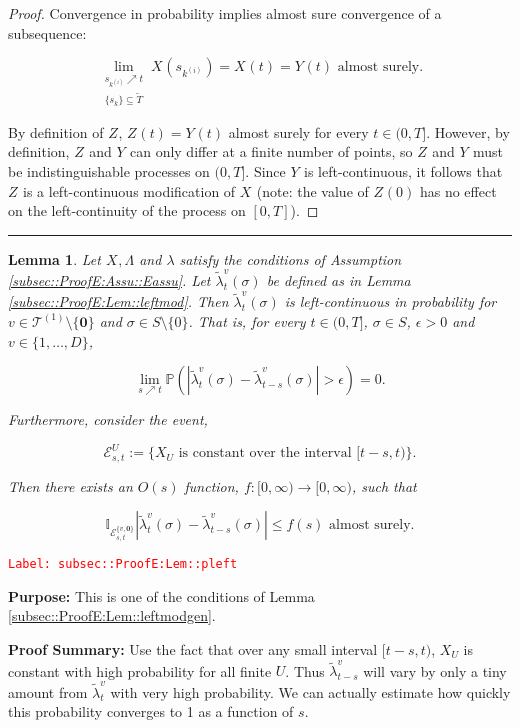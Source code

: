 \documentclass[12pt]{article}
\newcommand{\mb}{\mathbb}
\newcommand{\mc}{\mathcal}
\newcommand{\ra}{\rightarrow}
\newcommand{\te}{\text}
\newcommand{\ep}{\epsilon}
\newcommand{\tr}{\textcolor{red}}
\newcommand{\labe}[1]{\tr{\texttt{Label: #1}}}
\newcommand{\purpose}{\textbf{Purpose: }}
\newcommand{\pfsum}{\textbf{Proof Summary: }}
\newcommand{\lin}{\rule{\linewidth}{0.4 pt}}
\newcommand{\pr}{\mb{P}}							%
\renewcommand{\root}{\mathbf{0}}				%
\renewcommand{\v}{v}							%
\renewcommand{\U}{U}							%
\renewcommand{\S}{S}							%
\newcommand{\s}{\sigma}							%
\newcommand{\T}{T}								%
\renewcommand{\t}{t}							%
\renewcommand{\tt}{s}							%
\newcommand{\X}{X}								%
\newcommand{\vind}[1]{^{#1}}					%
\newcommand{\cind}[1]{_{#1}}					%
\newcommand{\tp}[1]{(#1)}						%
\newcommand{\tip}[1]{#1}						%
\newcommand{\ts}[1]{_{#1}}						%
\newcommand{\degr}{D}							%
\newcommand{\tree}{\mc{T}}						%
\newcommand{\sln}[1]{^{(#1)}}					%
\newcommand{\rate}{\lambda}						%
\newcommand{\alt}[1]{\widetilde{#1}}			%
\newcommand{\indx}[1]{_{#1}}					%
\newcommand{\XX}{Y}								%
\newcommand{\XXX}{Z}							%
\renewcommand{\it}{k}							%
\newcommand{\evnt}{\mc{E}}						%
\newcommand{\Tset}{\alt{T}}						%
\newcommand{\ratee}{\Lambda}					%
\newcommand{\crate}{\alt{\lambda}}				%
\newtheorem{lem}[thms]{Lemma}
\begin{document}
\begin{proof}
Convergence in probability implies almost sure convergence of a subsequence:

\[\lim_{\substack{\tt\indx{\it\sln{i}} \nearrow \t\\\{\tt\indx{\it}\}\subseteq \Tset}} \X\cind{}\tp{\tt\indx{\it\sln{i}}} = \X\cind{}\tp{\t} = \XX\cind{}\tp{\t} \te{ almost surely.}\]

By definition of \(\XXX\cind{}\tip{}\), \(\XXX\cind{}\tp{\t} = \XX\cind{}\tp{\t}\) almost surely for every \(\t \in (0,\T]\). However, by definition, \(\XXX\cind{}\tip{}\) and \(\XX\cind{}\tip{}\) can only differ at a finite number of points, so \(\XXX\cind{}\tip{}\) and \(\XX\cind{}\tip{}\) must be indistinguishable processes on \((0,\T]\). Since \(\XX\cind{}\tip{}\) is left-continuous, it follows that \(\XXX\cind{}\tip{}\) is a left-continuous modification of \(\X\cind{}\tip{}\) (note: the value of \(\XXX\cind{}\tp{0}\) has no effect on the left-continuity of the process on \([0,\T]\)).
\end{proof}

\lin

\begin{lem}
Let \(\X\cind{}\tip{},\ratee\) and \(\rate\) satisfy the conditions of Assumption \ref{subsec::ProofE:Assu::Eassu}. Let \(\crate\vind{\v}\ts{\t}(\s)\) be defined as in Lemma \ref{subsec::ProofE:Lem::leftmod}. Then \(\crate\vind{\v}\ts{\t}(\s)\) is left-continuous in probability for \(\v \in \tree\sln{1}\setminus\{\root\}\) and \(\s \in \S\setminus\{0\}\). That is, for every \(\t \in (0,\T]\), \(\s \in \S\), \(\ep > 0\) and \(\v\in \{1,\dots,\degr\}\),

\[\lim_{\tt \nearrow \t}\pr\left(|\crate\vind{\v}\ts{\t}(\s)- \crate\vind{\v}\ts{\t-\tt}(\s)| > \ep\right) = 0.\]

Furthermore, consider the event,

\[\evnt\vind{\U}\ts{\tt,\t} := \{\X\cind{\U}\tip{} \te{ is constant over the interval } [\t-\tt,\t)\}.\]

Then there exists an \(O(\tt)\) function, \(f:[0,\infty)\ra[0,\infty)\), such that 

\[\mb{I}_{\evnt\vind{\{\v,\root\}}\ts{\tt,\t}}|\crate\vind{\v}\ts{\t}(\s) - \crate\vind{\v}\ts{\t-\tt}(\s)| \leq f(\tt) \te{ almost surely.}\]
\label{subsec::ProofE:Lem::pleft}
\end{lem}
\labe{subsec::ProofE:Lem::pleft}

\purpose This is one of the conditions of Lemma \ref{subsec::ProofE:Lem::leftmodgen}.

\pfsum Use the fact that over any small interval \([\t-\tt,\t)\), \(\X\cind{U}\) is constant with high probability for all finite \(U\). Thus \(\crate\vind{v}\ts{\t-\tt}\) will vary by only a tiny amount from \(\crate\vind{v}\ts{\t}\) with very high probability. We can actually estimate how quickly this probability converges to 1 as a function of \(s\).
\end{document}

